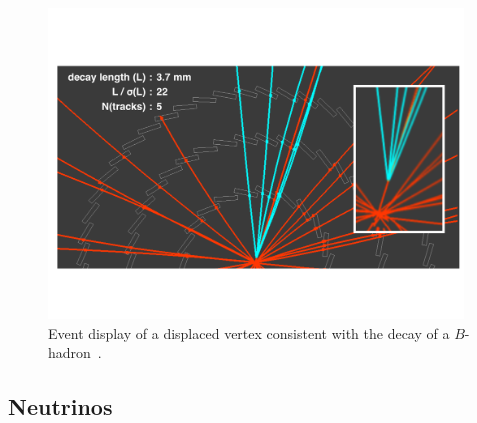 \begin{figure}[tp]
  \centering
  \includegraphics[width=0.98\textwidth]{figures/ATLAS-CONF-2010-004/fig_7_mod}
  \caption{Event display of a displaced vertex consistent with the decay of a $B$-hadron~\cite{ATLAS-CONF-2010-004}.}
  \label{fig:objects-btag-display}
\end{figure}

\subsection{Neutrinos}

